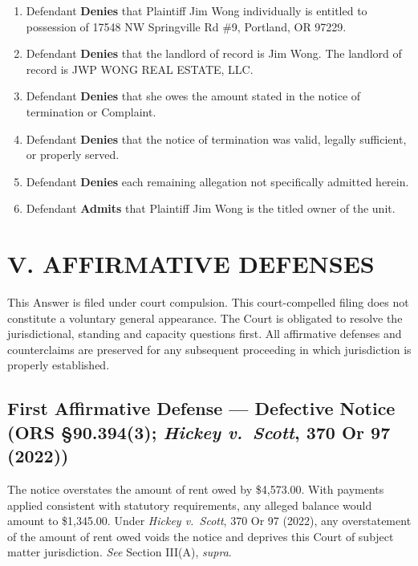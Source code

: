 \documentclass[12pt,letterpaper]{article}
\begin{document}
	\begin{enumerate}
		\item Defendant \textbf{Denies} that Plaintiff Jim Wong individually is entitled to possession of 17548 NW Springville Rd \#9, Portland, OR 97229.
		\item Defendant \textbf{Denies} that the landlord of record is Jim Wong. The landlord of record is JWP WONG REAL ESTATE, LLC.
		\item Defendant \textbf{Denies} that she owes the amount stated in the notice of termination or Complaint.
		\item Defendant \textbf{Denies} that the notice of termination was valid, legally sufficient, or properly served.
		\item Defendant \textbf{Denies} each remaining allegation not specifically admitted herein.
		\item Defendant \textbf{Admits} that Plaintiff Jim Wong is the titled owner of the unit.
	\end{enumerate}
	
	\section*{V. AFFIRMATIVE DEFENSES}
	
	This Answer is filed under court compulsion. This court-compelled filing does not constitute a voluntary general appearance. The Court is obligated to resolve the jurisdictional, standing and capacity questions first. All affirmative defenses and counterclaims are preserved for any subsequent proceeding in which jurisdiction is properly established.
	
	\subsection{First Affirmative Defense --- Defective Notice (ORS \S90.394(3); \textit{Hickey v.\ Scott}, 370 Or 97 (2022))}
	
	The notice overstates the amount of rent owed by \$4,573.00. With payments applied consistent with statutory requirements, any alleged balance would amount to \$1,345.00. Under \textit{Hickey v.\ Scott}, 370 Or 97 (2022), any overstatement of the amount of rent owed voids the notice and deprives this Court of subject matter jurisdiction. \textit{See} Section III(A), \textit{supra}.
	
\end{document}
